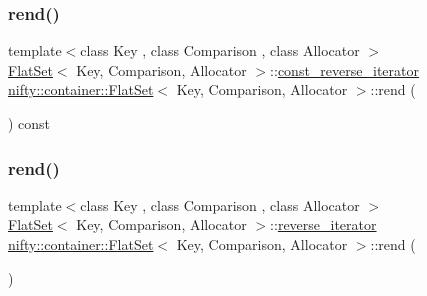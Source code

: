 \mbox{\label{classnifty_1_1container_1_1FlatSet_adad37eee25033eb4210619e61808229f}} 
\subsubsection{\texorpdfstring{rend()}{rend()}\hspace{0.1cm}{\footnotesize\ttfamily [1/2]}}
{\footnotesize\ttfamily template$<$class Key , class Comparison , class Allocator $>$ \\
\hyperlink{classnifty_1_1container_1_1FlatSet}{Flat\+Set}$<$ Key, Comparison, Allocator $>$\+::\hyperlink{classnifty_1_1container_1_1FlatSet_ab7858d2e6eeeb311e21988d9b4a5b802}{const\+\_\+reverse\+\_\+iterator} \hyperlink{classnifty_1_1container_1_1FlatSet}{nifty\+::container\+::\+Flat\+Set}$<$ Key, Comparison, Allocator $>$\+::rend (\begin{DoxyParamCaption}{ }\end{DoxyParamCaption}) const\hspace{0.3cm}{\ttfamily [inline]}}

\mbox{\label{classnifty_1_1container_1_1FlatSet_ae40f27aa1a23e148de77b596825cb205}} 
\subsubsection{\texorpdfstring{rend()}{rend()}\hspace{0.1cm}{\footnotesize\ttfamily [2/2]}}
{\footnotesize\ttfamily template$<$class Key , class Comparison , class Allocator $>$ \\
\hyperlink{classnifty_1_1container_1_1FlatSet}{Flat\+Set}$<$ Key, Comparison, Allocator $>$\+::\hyperlink{classnifty_1_1container_1_1FlatSet_a5ad537835e3b8911ac1beed1a95d3ac2}{reverse\+\_\+iterator} \hyperlink{classnifty_1_1container_1_1FlatSet}{nifty\+::container\+::\+Flat\+Set}$<$ Key, Comparison, Allocator $>$\+::rend (\begin{DoxyParamCaption}{ }\end{DoxyParamCaption})\hspace{0.3cm}{\ttfamily [inline]}}

